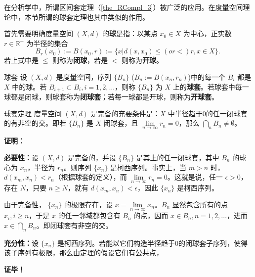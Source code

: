 在分析学中，所谓区间套定理（\autoref{the_RCompl_3}）被广泛的应用。在度量空间理论中，本节所谓的球套定理也其中类似的作用。

首先需要明确度量空间 $(X,d)$ 的\textbf{球}是指：以某点 $x_0\in X$ 为中心，正实数 $r\in\mathbb R^+$ 为半径的集合 
\begin{equation}
B_{r}(x_0):=B(x_0,r):=\{x|d(x,x_0)\leq(or <)r,x\in X\}.~
\end{equation}
若上式中是 $\leq$ 则称为\textbf{闭球}，若是 $<$ 则称为\textbf{开球}。
\begin{definition}{球套}
设 $(X,d)$ 是度量空间，序列 $\{B_n\}$ ($B_n:=B(x_n,r_n)$)中的每一个 $B_i$ 都是 $X$ 中的球。若 $B_{i+1}\subset B_{i},i=1,2,\ldots$，则称 $\{B_n\}$ 为 $X$ 上的\textbf{球套}。若球套中每一球都是闭球，则球套称为\textbf{闭球套}；若每一球都是开球，则称为\textbf{开球套}。
\end{definition}

\begin{theorem}{球套定理}
度量空间 $(X,d)$ 是完备的充要条件是：$X$ 中半径趋于0的任一闭球套的有非空的交。即若 $\{B_n\}$ 是 $X$ 闭球套，且 $\lim\limits_{n\rightarrow\infty}r_n=0$，那么 $\bigcap\limits_n B_n\neq\emptyset$。
\end{theorem}

\textbf{证明：}

\textbf{必要性：}设 $(X,d)$ 是完备的，并设 $\{B_n\}$ 是其上的任一闭球套，其中 $B_n$ 的球心为 $x_n$，半径为 $r_n$。则序列 $\{x_n\}$ 是柯西序列。事实上，当 $m>n$ 时，$d(x_m,x_n)<r_n$（根据球套的定义），而 $\lim\limits_{n\rightarrow\infty}r_n=0$。这就是说，任一 $\epsilon>0$，存在 $N$，只要 $n\geq N$，就有 $d(x_m,x_n)<\epsilon$，因此 $\{x_n\}$ 是柯西序列。

由于完备性， $\{x_n\}$ 的极限存在，设 $x=\lim\limits_{n\rightarrow\infty}x_n$。$B_n$ 显然包含所有的点 $x_i,i\geq n$，于是 $x$ 的任一邻域都包含有 $B_n$ 的点，因而 $x\in B_n,n=1,2,\ldots$，进而
$x\in\bigcap\limits_n B_n$。即闭球套有非空的交。

\textbf{充分性：}设 $\{x_n\}$ 是柯西序列。若能以它们构造半径趋于0的闭球套子序列，使得该子序列有极限，那么由定理的假设它们有公共点，

\textbf{证毕！}









